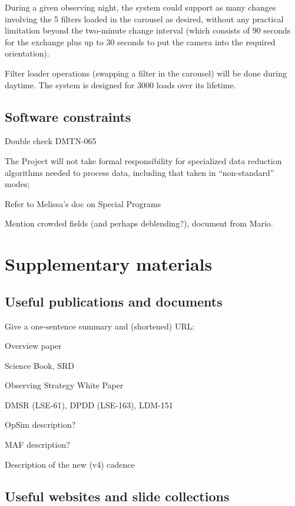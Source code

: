 \documentclass[DM,lsstdraft,toc,usenatbib]{lsstdoc}
\begin{document}
During a given observing night, the system could support as many changes involving the 5 filters loaded in the carousel as desired, without any practical limitation beyond the two-minute change interval (which consists of 90 seconds for the exchange plus up to 30 seconds to put the camera into the required orientation). 

Filter loader operations (swapping a filter in the carousel) will be done during daytime. The system is designed for 3000 loads over its lifetime. 




\subsection{Software constraints} 

Double check DMTN-065

The Project will not take formal responsibility for specialized data reduction algorithms 
needed to process data, including that taken in ``non-standard'' modes; 
   
Refer to Melissa's doc on Special Programs 

Mention crowded fields (and perhaps deblending?), document from Mario. 



\section{Supplementary materials} 


\subsection{Useful publications and documents}

Give a one-sentence summary and (shortened) URL:  

Overview paper

Science Book, SRD 

Observing Strategy White Paper 

DMSR (LSE-61), DPDD (LSE-163), LDM-151 

OpSim description?  

MAF description?  

Description of the new (v4) cadence 

\subsection{Useful websites and slide collections}
\end{document}
